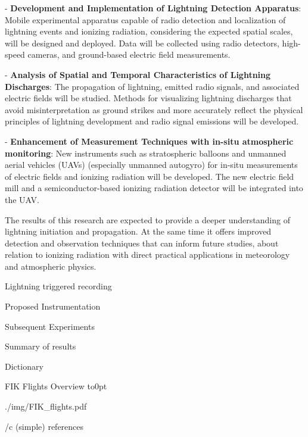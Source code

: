 \begitems
\item - {\bf Development and Implementation of Lightning Detection Apparatus}: Mobile experimental apparatus capable of radio detection and localization of lightning events and ionizing radiation, considering the expected spatial scales, will be designed and deployed. Data will be collected using radio detectors, high-speed cameras, and ground-based electric field measurements.
\item - {\bf Analysis of Spatial and Temporal Characteristics of Lightning Discharges}: The propagation of lightning, emitted radio signals, and associated electric fields will be studied. Methods for visualizing lightning discharges that avoid misinterpretation as ground strikes and more accurately reflect the physical principles of lightning development and radio signal emissions will be developed.
\item - {\bf Enhancement of Measurement Techniques with in-situ atmospheric monitoring}: New instruments such as stratospheric balloons and unmanned aerial vehicles (UAVs) (especially unmanned autogyro) for in-situ measurements of electric fields and ionizing radiation will be developed. The new electric field mill and a semiconductor-based ionizing radiation detector will be integrated into the UAV.
\enditems

The results of this research are expected to provide a deeper understanding of lightning initiation and propagation. At the same time it offers improved detection and observation techniques that can inform future studies, about relation to ionizing radiation with direct practical applications in meteorology and atmospheric physics.

 

 Lightning triggered recording 

 

\chap[instrumentation] Proposed Instrumentation

 

\chap[experiments] Subsequent Experiments

 

\chap[results] Summary of results

 

\app Dictionary
\makeglos

\app FIK Flights Overview
\vbox to0pt{\vskip-25mm\centerline{\inspic ./img/FIK_flights.pdf }\vss}
\nextoddpage

\bibchap
\usebib/c (simple) references

\bye
